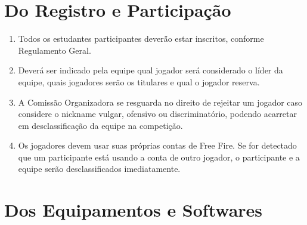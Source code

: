 \section*{Do Registro e Participação}

\begin{enumerate}[start=1,label={\bfseries Art. \arabic*$^\circ$ - }, resume]
    \item Todos os estudantes participantes deverã́o estar inscritos, conforme
        Regulamento Geral.
    \item Deverá ser indicado pela equipe qual jogador será considerado o
        líder da equipe, quais jogadores serão os titulares e qual o jogador
        reserva.
    \item A Comissão Organizadora se resguarda no direito de rejeitar um jogador
        caso considere o nickname vulgar, ofensivo ou discriminatório,
        podendo acarretar em desclassificação da equipe na competição.
    \item Os jogadores devem usar suas próprias contas de Free Fire. Se for
        detectado que um participante está usando a conta de outro jogador,
        o participante e a equipe serão desclassificados imediatamente.
\end{enumerate}

\section*{Dos Equipamentos e Softwares}
\label{sec:objetivos}

